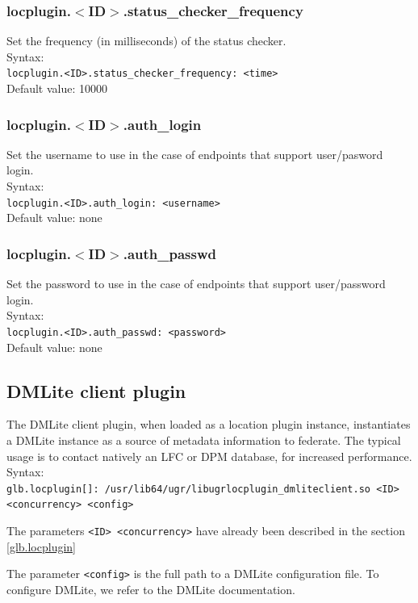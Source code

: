 \documentclass[12pt]{article} %
\begin{document}
\subsubsection{locplugin.$<$ID$>$.status\_checker\_frequency}
Set the frequency (in milliseconds) of the status checker.\\
Syntax:\\
\verb"locplugin.<ID>.status_checker_frequency: <time>"\\
Default value: 10000\\
\subsubsection{locplugin.$<$ID$>$.auth\_login}
Set the username to use in the case of endpoints that support user/pasword login.\\
Syntax:\\
\verb"locplugin.<ID>.auth_login: <username>"\\
Default value: none\\
\subsubsection{locplugin.$<$ID$>$.auth\_passwd}
Set the password to use in the case of endpoints that support user/password login.\\
Syntax:\\
\verb"locplugin.<ID>.auth_passwd: <password>"\\
Default value: none\\



\subsection{DMLite client plugin}

The DMLite client plugin, when loaded as a location plugin instance, instantiates a DMLite instance as a source of metadata information to federate. The typical usage is to contact natively an LFC or DPM database, for increased performance.\\

Syntax:\\
\verb"glb.locplugin[]: /usr/lib64/ugr/libugrlocplugin_dmliteclient.so <ID> <concurrency> <config>"

The parameters \verb"<ID> <concurrency>" have already been described in the section \ref{glb.locplugin}

The parameter \verb"<config>" is the full path to a DMLite configuration file. To configure DMLite, we refer to the DMLite documentation.
\end{document}
